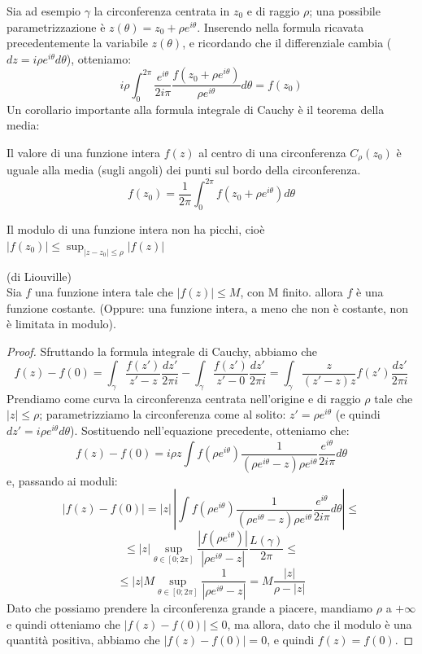 Sia ad esempio $\gamma$ la circonferenza centrata in $z_0$ e di raggio $\rho$; una possibile parametrizzazione è $z(\theta)=z_0 + \rho e^{i\theta}$. Inserendo nella formula ricavata precedentemente la variabile $z(\theta)$, e ricordando che il differenziale cambia ($dz=i \rho e^{i\theta}d\theta$), otteniamo:
$$i \rho  \int_0 ^{2 \pi} \frac{e^{i\theta}}{2 i \pi} \frac{f(z_0+ \rho e^{i \theta})}{ \rho  e^{i\theta}} d\theta=f(z_0)$$
Un corollario importante alla formula integrale di Cauchy è il teorema della media:
\begin{teorema}
Il valore di una funzione intera $f(z)$ al centro di una circonferenza $C_{\rho} (z_0)$ è uguale alla media (sugli angoli) dei punti sul bordo della circonferenza.
$$f(z_0)=\frac{1}{2 \pi} \int_0 ^{2 \pi} f(z_0 +  \rho e^{i\theta}) d\theta$$
\end{teorema}
\begin{corollario}
Il modulo di una funzione intera non ha picchi, cioè $|f(z_0)| \leq \sup_{|z-z_0| \leq  \rho } |f(z)|$
\end{corollario}
\begin{teorema} (di Liouville)\\
Sia $f$ una funzione intera tale che $|f(z)| \leq M$, con M finito. allora $f$ è una funzione costante. (Oppure: una funzione intera, a meno che non è costante, non è limitata in modulo).
\end{teorema}
\begin{proof}
Sfruttando la formula integrale di Cauchy, abbiamo che 
$$f(z)-f(0)=\int_{\gamma} \frac{f(z')}{z'-z} \frac{dz'}{2 \pi i}-\int_{\gamma} \frac{f(z')}{z'-0} \frac{dz'}{2 \pi i}=\int_{\gamma} \frac{z}{(z'-z)z} f(z') \frac{dz'}{2 \pi i}$$
Prendiamo come curva la circonferenza centrata nell'origine e di raggio $\rho$ tale che $|z| \leq \rho$; parametrizziamo la circonferenza come al solito: $z'=\rho e^{i\theta}$ (e quindi $dz'=i \rho e^{i\theta} d\theta$). Sostituendo nell'equazione precedente, otteniamo che:
$$f(z)-f(0)=i \rho z \int f(\rho e^{i\theta}) \frac{1}{(\rho e^{i\theta}-z)\rho e^{i\theta}} \frac{e^{i\theta}}{2 i \pi} d\theta$$
e, passando ai moduli:
$$|f(z)-f(0)|=|z| \, \left|\int f(\rho e^{i\theta}) \frac{1}{(\rho e^{i\theta}-z)\rho e^{i\theta}} \frac{e^{i\theta}}{2 i \pi} d\theta \right| \leq$$
$$\leq |z|\sup_{\theta \in [0;2\pi]} \frac{|f(\rho e^{i\theta})|}{|\rho e^{i\theta}-z|} \frac{L(\gamma)}{2 \pi} \leq$$
$$\leq |z| M \sup_{\theta \in [0;2\pi]} \frac{1}{|\rho e^{i\theta}-z|} =M \frac {|z|}{\rho-|z|}$$
Dato che possiamo prendere la circonferenza grande a piacere, mandiamo $\rho$ a $+\infty$ e quindi otteniamo che $|f(z)-f(0)| \leq 0$, ma allora, dato che il modulo è una quantità positiva, abbiamo che $|f(z)-f(0)|=0$, e quindi $f(z)=f(0)$.

\end{proof}
